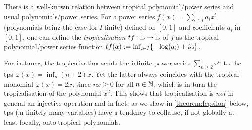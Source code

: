 \begin{remark}\label{rmk:val_trop}
 There is a well-known relation between tropical polynomial/power series and usual polynomials/power series. 
For a power series $f(x)=\sum_{i\in I} a_i x^i$ (polynomials being the case for $I$ finite) defined on $[0,1]$ and coefficients $a_i$ in $[0,1]$, %
one can define the \emph{tropicalisation} $\trop f:\Lawv \to \Lawv$ of $f$ as the tropical polynomial/power series function $\trop f(\alpha):=\inf_{i\in I} \set{-\log(a_i)+i\alpha}$.
\end{remark}


For instance, the tropicalisation sends the infinite power series $\sum_{n\geq 2} x^n$ to the tps $\varphi(x)=\inf_n (n+2)x$.
Yet the latter always coincides with the tropical monomial $\varphi(x)=2x$, since $nx\geq 0$ for all $n\in\mathbb{N}$, which is in turn the tropicalisation of the polynomial $x^2$.
This shows that tropicalisation is \emph{not} in general an injective operation and in fact, as we show in \autoref{theorem:fepsilon} below, tps (in finitely many variables) have a tendency to collapse, if not globally at least locally, onto tropical polynomials.


